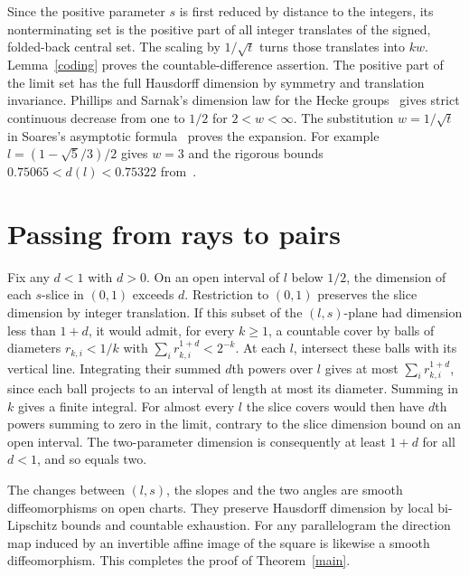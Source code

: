 \documentclass[11pt]{article}
\begin{document}
Since the positive parameter $s$ is first reduced by distance to the integers, its nonterminating set is the positive part of all integer translates of the signed, folded-back central set. The scaling by $1/\sqrt t$ turns those translates into $kw$. Lemma~\ref{coding} proves the countable-difference assertion. The positive part of the limit set has the full Hausdorff dimension by symmetry and translation invariance. Phillips and Sarnak's dimension law for the Hecke groups~\cite{PS} gives strict continuous decrease from one to $1/2$ for $2<w<\infty$. The substitution $w=1/\sqrt t$ in Soares's asymptotic formula~\cite[Theorem~1.9]{Soares} proves the expansion. For example $l=(1-\sqrt5/3)/2$ gives $w=3$ and the rigorous bounds $0.75065<d(l)<0.75322$ from~\cite[Remark~1.12]{Soares}.

\section{Passing from rays to pairs}

Fix any $d<1$ with $d>0$. On an open interval of $l$ below $1/2$, the dimension of each $s$-slice in $(0,1)$ exceeds $d$. Restriction to $(0,1)$ preserves the slice dimension by integer translation. If this subset of the $(l,s)$-plane had dimension less than $1+d$, it would admit, for every $k\ge1$, a countable cover by balls of diameters $r_{k,i}<1/k$ with $\sum_i r_{k,i}^{1+d}<2^{-k}$. At each $l$, intersect these balls with its vertical line. Integrating their summed $d$th powers over $l$ gives at most $\sum_i r_{k,i}^{1+d}$, since each ball projects to an interval of length at most its diameter. Summing in $k$ gives a finite integral. For almost every $l$ the slice covers would then have $d$th powers summing to zero in the limit, contrary to the slice dimension bound on an open interval. The two-parameter dimension is consequently at least $1+d$ for all $d<1$, and so equals two.

The changes between $(l,s)$, the slopes and the two angles are smooth diffeomorphisms on open charts. They preserve Hausdorff dimension by local bi-Lipschitz bounds and countable exhaustion. For any parallelogram the direction map induced by an invertible affine image of the square is likewise a smooth diffeomorphism. This completes the proof of Theorem~\ref{main}.
\end{document}

